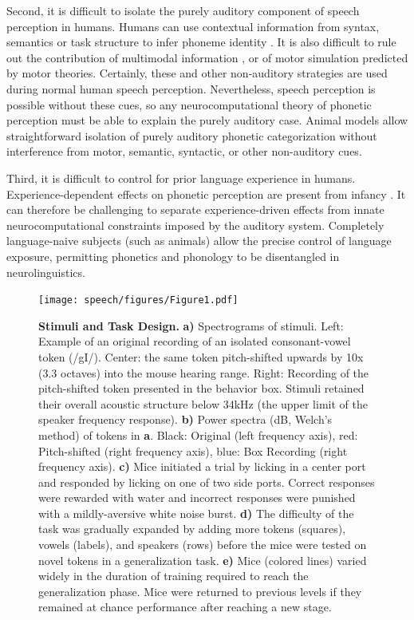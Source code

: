 Second, it is difficult to isolate the purely auditory component of speech perception in humans. Humans can use contextual information from syntax, semantics or task structure to infer phoneme identity \citep{Fox2016,Schouten2003}. It is also difficult to rule out the contribution of multimodal information \citep{Rosenblum2008}, or of motor simulation predicted by motor theories. Certainly, these and other non-auditory strategies are used during normal human speech perception. Nevertheless, speech perception is possible without these cues, so any neurocomputational theory of phonetic perception must be able to explain the purely auditory case. Animal models allow straightforward isolation of purely auditory phonetic categorization without interference from motor, semantic, syntactic, or other non-auditory cues.

Third, it is difficult to control for prior language experience in humans. Experience-dependent effects on phonetic perception are present from infancy \citep{Kuhl1992}. It can therefore be challenging to separate experience-driven effects from innate neurocomputational constraints imposed by the auditory system. Completely language-naive subjects (such as animals) allow the precise control of language exposure, permitting phonetics and phonology to be disentangled in neurolinguistics.

\begin{figure}[!hb]
\begin{centering}
\texttt{[image: speech/figures/Figure1.pdf]}
\caption{\textbf{Stimuli and Task Design.} \textbf{a)} Spectrograms of stimuli. Left: Example of an original recording of an isolated consonant-vowel token (/gI/). Center: the same token pitch-shifted upwards by 10x (3.3 octaves) into the mouse hearing range. Right: Recording of the pitch-shifted token presented in the behavior box. Stimuli retained their overall acoustic structure below 34kHz (the upper limit of the speaker frequency response). \textbf{b)} Power spectra (dB, Welch's method) of tokens in \textbf{a}. Black: Original (left frequency axis), red: Pitch-shifted (right frequency axis), blue: Box Recording (right frequency axis). \textbf{c)} Mice initiated a trial by licking in a center port and responded by licking on one of two side ports. Correct responses were rewarded with water and incorrect responses were punished with a mildly-aversive white noise burst. \textbf{d)} The difficulty of the task was gradually expanded by adding more tokens (squares), vowels (labels), and speakers (rows) before the mice were tested on novel tokens in a generalization task. \textbf{e)} Mice (colored lines) varied widely in the duration of training required to reach the generalization phase. Mice were returned to previous levels if they remained at chance performance after reaching a new stage.
}\end{centering}
\label{spectro}
\end{figure}


